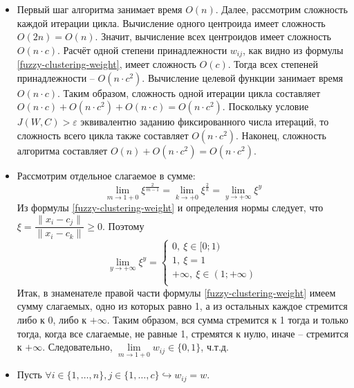 \begin{itemize}
    \item Первый шаг алгоритма занимает время $O(n)$. Далее, рассмотрим сложность каждой итерации
        цикла. Вычисление одного центроида имеет сложность $O(2n) = O(n)$. Значит, вычисление всех
        центроидов имеет сложность $O(n \cdot c)$. Расчёт одной степени принадлежности $w_{ij}$, как
        видно из формулы \eqref{fuzzy-clustering-weight}, имеет сложность $O(c)$. Тогда всех
        степеней принадлежности -- $O(n \cdot c^2)$. Вычисление целевой функции занимает время
        $O(n \cdot c)$. Таким образом, сложность одной итерации цикла составляет
        $O(n \cdot c) + O(n \cdot c^2) + O(n \cdot c) = O(n \cdot c^2)$. Поскольку условие
        $J(W, C) > \varepsilon$ эквивалентно заданию фиксированного числа итераций, то сложность
        всего цикла также составляет $O(n \cdot c^2)$. Наконец, сложность алгоритма составляет
        $O(n) + O(n \cdot c^2) = O(n \cdot c^2)$.
    \item Рассмотрим отдельное слагаемое в сумме:
        \begin{equation*}
            \lim\limits_{m \to 1 + 0} \xi^{\frac{2}{m - 1}} =
            \lim\limits_{k \to +0} \xi^{\frac{2}{k}} =
            \lim\limits_{y \to +\infty} \xi^{y}
        \end{equation*}
        Из формулы \eqref{fuzzy-clustering-weight} и определения нормы следует, что
        $\xi = \dfrac{\lVert x_i - c_j \rVert}{\lVert x_i - c_k \rVert} \geq 0$. Поэтому
        \begin{equation*}
            \lim\limits_{y \to +\infty} \xi^{y} =
            \begin{cases}
                0,\ \xi \in [0; 1) \\
                1,\ \xi = 1 \\
                +\infty,\ \xi \in (1; +\infty) \\
            \end{cases}
        \end{equation*}
        Итак, в знаменателе правой части формулы \eqref{fuzzy-clustering-weight} имеем сумму
        слагаемых, одно из которых равно 1, а из остальных каждое стремится либо к 0, либо к
        $+\infty$. Таким образом, вся сумма стремится к 1 тогда и только тогда, когда все
        слагаемые, не равные 1, стремятся к нулю, иначе -- стремится к $+\infty$. Следовательно,
        $\lim\limits_{m \to 1 + 0}w_{ij} \in \{0, 1\}$, ч.т.д.
    \item Пусть $\forall i \in \{1, \ldots, n\}, j \in \{1, \ldots, c\} \hookrightarrow w_{ij} = w$.

\end{itemize}
